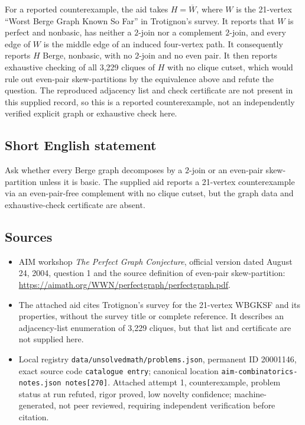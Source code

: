 \documentclass[11pt]{article}
\begin{document}
For a reported counterexample, the aid takes $H=\overline W$, where $W$ is the 21-vertex ``Worst Berge Graph Known So Far'' in Trotignon's survey. It reports that $W$ is perfect and nonbasic, has neither a $2$-join nor a complement $2$-join, and every edge of $W$ is the middle edge of an induced four-vertex path. It consequently reports $H$ Berge, nonbasic, with no $2$-join and no even pair. It then reports exhaustive checking of all 3,229 cliques of $H$ with no clique cutset, which would rule out even-pair skew-partitions by the equivalence above and refute the question. The reproduced adjacency list and check certificate are not present in this supplied record, so this is a reported counterexample, not an independently verified explicit graph or exhaustive check here.
\subsection{Short English statement}
Ask whether every Berge graph decomposes by a $2$-join or an even-pair skew-partition unless it is basic. The supplied aid reports a 21-vertex counterexample via an even-pair-free complement with no clique cutset, but the graph data and exhaustive-check certificate are absent.
\subsection{Sources}
\begin{itemize}
\item AIM workshop \emph{The Perfect Graph Conjecture}, official version dated August 24, 2004, question 1 and the source definition of even-pair skew-partition: \url{https://aimath.org/WWN/perfectgraph/perfectgraph.pdf}.
\item The attached aid cites Trotignon's survey for the 21-vertex WBGKSF and its properties, without the survey title or complete reference. It describes an adjacency-list enumeration of 3,229 cliques, but that list and certificate are not supplied here.
\item Local registry \texttt{data/unsolvedmath/problems.json}, permanent ID 20001146, exact source code \texttt{catalogue entry}; canonical location \texttt{aim-combinatorics-notes.json notes[270]}. Attached attempt 1, counterexample, problem status at run refuted, rigor proved, low novelty confidence; machine-generated, not peer reviewed, requiring independent verification before citation.
\end{itemize}
\end{document}
